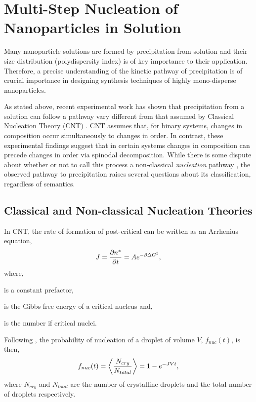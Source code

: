 \section{Multi-Step Nucleation of Nanoparticles in Solution} %


Many nanoparticle solutions are formed by precipitation from solution and their
size distribution (polydispersity index) is of key importance to their
application. Therefore, a precise understanding of the kinetic pathway of
precipitation is of crucial importance in designing synthesis techniques of
highly mono-disperse nanoparticles.

As stated above, recent experimental work has shown that precipitation from a
solution can follow a pathway vary different from that assumed by Classical
Nucleation Theory (CNT) \cite{LOH17, WALLACE13}. CNT assumes that, for binary
systems, changes in composition occur simultaneously to changes in order. In
contrast, these experimental findings suggest that in certain systems changes
in composition can precede changes in order via spinodal decomposition. While
there is some dispute about whether or not to call this process a non-classical
\textit{nucleation} pathway \cite{DAVEY13, GEBAUER11}, the observed pathway to
precipitation raises several questions about its classification, regardless of
semantics.

\subsection{Classical and Non-classical Nucleation Theories} %


In CNT, the rate of formation of post-critical can be written as an Arrhenius
equation,
%
\begin{equation}
    J = \frac{\partial n^*}{\partial t} = A e^{-\beta\Delta G^{\ddagger}},
\end{equation}
where,
\begin{description}[labelwidth=1cm, align=right]
    \item[$A$] is a constant prefactor,
    \item[$\Delta G^\ddagger$] is the Gibbs free energy of a critical nucleus
        and, 
    \item[$n^*$] is the number if critical nuclei.
\end{description}
% 
Following \cite{MYERSON04}, the probability of nucleation of a droplet of
volume $V$, $f_{nuc}(t)$, is then,
%
\begin{equation}
    f_{nuc}(t) = \left\langle \frac{N_{cry}}{N_{total}} \right\rangle = 1 - e^{-J V t},
\end{equation}
%
where $N_{cry}$ and $N_{total}$ are the number of crystalline droplets and the
total number of droplets respectively.

